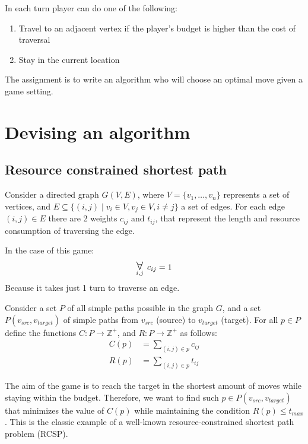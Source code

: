 \documentclass[12pt]{article}
\DeclareMathOperator*{\bigforall}{\mbox{\Large $\mathsurround0pt \forall$}}
\newcommand*{\source}{\ensuremath{v_{src}}}
\newcommand*{\target}{\ensuremath{v_{target}}}
\begin{document}
In each turn player can do one of the following:
\begin{enumerate}
    \item Travel to an adjacent vertex if the player's budget is higher than the cost of traversal
    \item Stay in the current location
\end{enumerate}

The assignment is to write an algorithm who will choose an optimal move given a game setting.

\section{Devising an algorithm}

\subsection{Resource constrained shortest path}

Consider a directed graph $G(V,E)$, where $V = \{v_1, \ldots , v_n\}$ represents a set of vertices,
and $E \subseteq \{ (i,j) \mid v_i \in V, v_j \in V, i \neq j \}$ a set of edges.
For each edge $(i,j) \in E$ there are 2 weights $c_{ij}$ and $t_{ij}$,
that represent the length and resource consumption of traversing the edge.

In the case of this game:
\begin{equation}
    \bigforall_{i,j} \; c_{ij} = 1
    \label{eq:all_cost_one}
\end{equation}
Because it takes just 1 turn to traverse an edge.

Consider a set $P$ of all simple paths possible in the graph $G$, and a set $P(\source,\target)$
of simple paths from $\source$ (source) to $\target$ (target).
For all $p \in P$ define the functions $C: P \to \mathbb{Z}^+$, and $R: P \to \mathbb{Z}^+$ as follows:
\begin{align}
    C(p) & = \sum\limits_{(i,j) \in p} c_{ij} \label{eq:len-func}  \\
    R(p) & = \sum\limits_{(i,j) \in p} t_{ij} \label{eq:cost-func}
\end{align}

The aim of the game is to reach the target in the shortest amount of moves while staying within the budget.
Therefore, we want to find such $p \in P(\source,\target)$ that minimizes the value of $C(p)$ while maintaining the condition $R(p) \leq t_{max}$.
This is the classic example of a well-known resource-constrained shortest path problem (RCSP).
\end{document}
